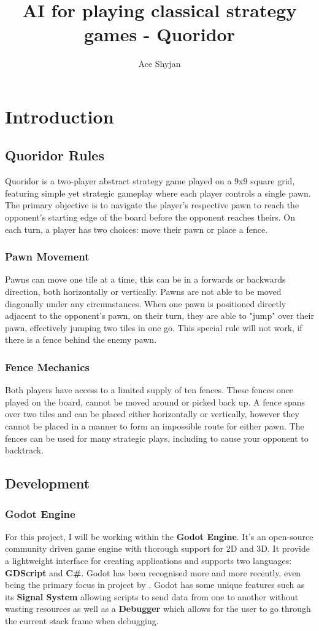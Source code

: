 \documentclass[review]{cmpreport}
\title{AI for playing classical strategy games - Quoridor}
\author{Ace Shyjan}
\begin{document}
\section{Introduction}

\subsection{Quoridor Rules}
Quoridor is a two-player abstract strategy game played on a 9x9 square grid, featuring simple yet strategic gameplay where each player controls a single pawn. The primary objective is to navigate the player's respective pawn to reach the opponent’s starting edge of the board before the opponent reaches theirs. On each turn, a player has two choices: move their pawn or place a fence. 

\subsubsection{Pawn Movement}
Pawns can move one tile at a time, this can be in a forwards or backwards direction, both horizontally or vertically. Pawns are not able to be moved diagonally under any circumstances. When one pawn is positioned directly adjacent to the opponent's pawn, on their turn, they are able to "jump" over their pawn, effectively jumping two tiles in one go. This special rule will not work, if there is a fence behind the enemy pawn.

\subsubsection{Fence Mechanics}
Both players have access to a limited supply of ten fences. These fences once played on the board, cannot be moved around or picked back up. A fence spans over two tiles and can be placed either horizontally or vertically, however they cannot be placed in a manner to form an impossible route for either pawn. The fences can be used for many strategic plays, including to cause your opponent to backtrack.

\subsection{Development}
\subsubsection{Godot Engine}
For this project, I will be working within the \textbf{Godot Engine}. It's an open-source community driven game engine with thorough support for 2D and 3D. It provide a lightweight interface for creating applications and supports two languages: \textbf{GDScript} and \textbf{C\#}. Godot has been recognised more and more recently, even being the primary focus in project by \cite{salmela2022game}. Godot has some unique features such as its \textbf{Signal System} allowing scripts to send data from one to another without wasting resources as well as a \textbf{Debugger} which allows for the user to go through the current stack frame when debugging.
\end{document}
